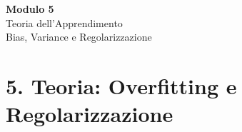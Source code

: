 \documentclass[aspectratio=169, 10pt]{beamer}
\begin{document}

\begin{frame}[plain]
    \centering
    \vspace{2cm}
    {\Huge \textbf{Modulo 5}}\\[0.5cm]
    {\Huge \textcolor{Accent}{Teoria dell'Apprendimento}}\\[1cm]
    {\large Bias, Variance e Regolarizzazione}
\end{frame}

\section{5. Teoria: Overfitting e Regolarizzazione}
\end{document}
